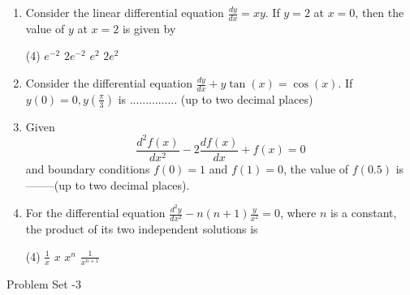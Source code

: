 \begin{enumerate}[label=\color{ocre}\textbf{\arabic*.}]
	{}
	\begin{tasks}(4)
		\task[\textbf{A.}] P, R and S only
		\task[\textbf{B.}]  P and R only
		\task[\textbf{C.}] $\mathrm{Q}$ and $\mathrm{R}$ only
		\task[\textbf{D.}] $\mathrm{R}$ and $\mathrm{S}$ only
	\end{tasks}
	\item Consider the linear differential equation $\frac{d y}{d x}=x y$. If $y=2$ at $x=0$, then the value of $y$ at $x=2$ is given by
	{}
	\begin{tasks}(4)
		\task[\textbf{A.}]  $e^{-2}$
		\task[\textbf{B.}] $2 e^{-2}$
		\task[\textbf{C.}] $e^{2}$
		\task[\textbf{D.}]  $2 e^{2}$
	\end{tasks}
	\item Consider the differential equation $\frac{d y}{d x}+y \tan (x)=\cos (x)$. If $y(0)=0, y\left(\frac{\pi}{3}\right)$ is ............... (up to two decimal places)
	{}
	\item Given
	$$
	\frac{d^{2} f(x)}{d x^{2}}-2 \frac{d f(x)}{d x}+f(x)=0
	$$
	and boundary conditions $f(0)=1$ and $f(1)=0$, the value of $f(0.5)$ is --------(up
	to two decimal places).
	{}
	\item  For the differential equation $\frac{d^{2} y}{d x^{2}}-n(n+1) \frac{y}{x^{2}}=0$, where $n$ is a constant, the product of
	its two independent solutions is
	{}
	\begin{tasks}(4)
		\task[\textbf{A.}] $\frac{1}{x}$
		\task[\textbf{B.}] $x$
		\task[\textbf{C.}] $x^{n}$
		\task[\textbf{D.}] $\frac{1}{x^{n+1}}$
	\end{tasks}
	\end{enumerate}
\newpage 
\begin{abox}
	Problem Set -3
\end{abox}
